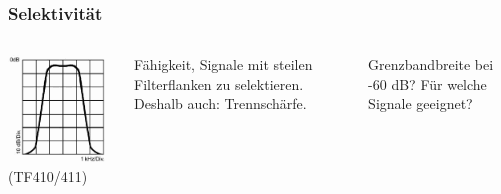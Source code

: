 \begin{frame}
    \frametitle{Selektivität}

    \begin{columns}
      \begin{center}
      \includegraphics[width=\textwidth,height=.8\textheight,keepaspectratio]{a18/TF410.png}\\
        {\tiny (TF410/411)}
      \end{center}


      Fähigkeit, Signale mit steilen Filterflanken zu selektieren. Deshalb auch:
      Trennschärfe.

      \begin{exampleblock}{Grenzbandbreite bei -60 dB? Für welche Signale geeignet?}
      \end{exampleblock}

    \end{columns}

\end{frame}

